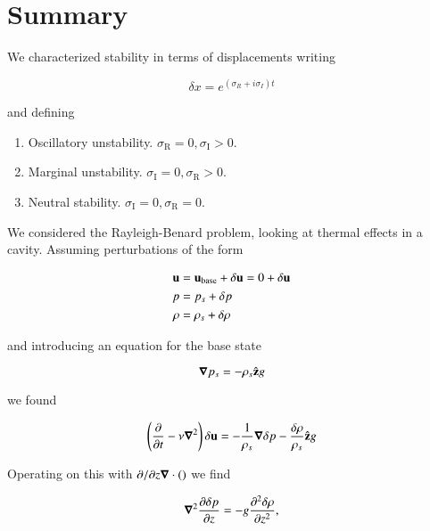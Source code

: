 \section{Summary}

We characterized stability in terms of displacements writing

\begin{equation}\label{eqn:continuumFluidsReview:2770}
\delta x = e^{(\sigma_R + i \sigma_I) t}
\end{equation}

and defining
\begin{enumerate}
\item Oscillatory unstability.  $\sigma_{\text{R}} = 0, \sigma_{\text{I}} > 0$.
\item Marginal unstability.  $\sigma_{\text{I}} = 0, \sigma_{\text{R}} > 0$.
\item Neutral stability.  $\sigma_{\text{I}} = 0, \sigma_{\text{R}} = 0$.
\end{enumerate}


We considered the Rayleigh-Benard problem, looking at thermal effects in a cavity.  Assuming perturbations of the form

\begin{align*}
\Bu &= \Bu_{\text{base}} + \delta \Bu = 0 + \delta \Bu \\
p &= p_s + \delta p \\
\rho &= \rho_s + \delta \rho
\end{align*}

and introducing an equation for the base state

\begin{equation}\label{eqn:continuumFluidsReview:2790}
\spacegrad p_s = -\rho_s \zcap g
\end{equation}

we found

\begin{equation}\label{eqn:continuumFluidsReview:2810}
\left( \PD{t}{} - \nu \spacegrad^2 \right) \delta \Bu = -\inv{\rho_s} \spacegrad \delta p - \frac{\delta \rho}{\rho_s} \zcap g
\end{equation}

Operating on this with $\PDi{z}{} \spacegrad \cdot ()$ we find

\begin{equation}\label{eqn:continuumFluidsReview:2830}
\spacegrad^2 \PD{z}{\delta p} = -g \PDSq{z}{\delta \rho},
\end{equation}

